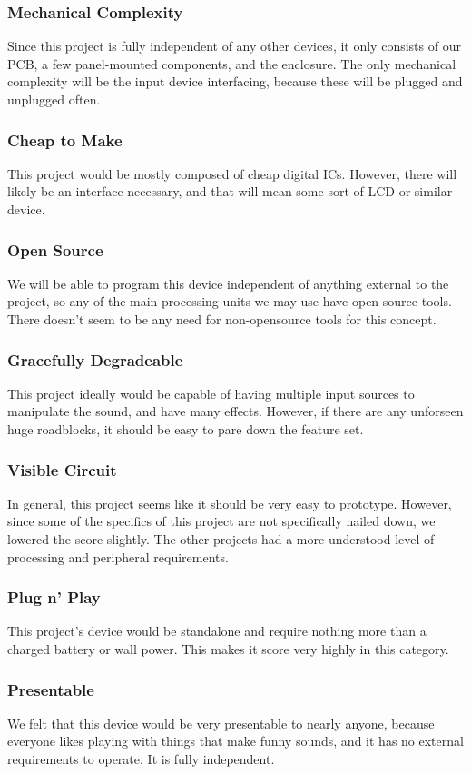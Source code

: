 \documentclass{article}
\begin{document}
\subsubsection {Mechanical Complexity}
Since this project is fully independent of any other devices, it only consists
of our PCB, a few panel-mounted components, and the enclosure. The only 
mechanical complexity will be the input device interfacing, because these will
be plugged and unplugged often.
\subsubsection{Cheap to Make}
This project would be mostly composed of cheap digital ICs. However, there will
likely be an interface necessary, and that will mean some sort of LCD or similar
device.  
\subsubsection{Open Source}
We will be able to program this device independent of anything external to the
project, so any of the main processing units we may use have open source tools.
There doesn't seem to be any need for non-opensource tools for this concept.
\subsubsection{Gracefully Degradeable}
This project ideally would be capable of having multiple input sources to
manipulate the sound, and have many effects. However, if there are any unforseen
huge roadblocks, it should be easy to pare down the feature set.
\subsubsection{Visible Circuit}
In general, this project seems like it should be very easy to prototype. However,
since some of the specifics of this project are not specifically nailed down, we
lowered the score slightly. The other projects had a more understood level of
processing and peripheral requirements.
\subsubsection{Plug n' Play}
This project's device would be standalone and require nothing more than a charged
battery or wall power. This makes it score very highly in this category.
\subsubsection{Presentable}
We felt that this device would be very presentable to nearly anyone, because
everyone likes playing with things that make funny sounds, and it has no external
requirements to operate. It is fully independent.
\end{document}
